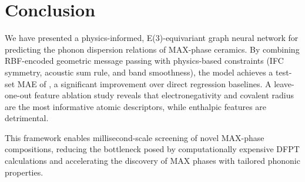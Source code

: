 \section{Conclusion}

We have presented a physics-informed, E(3)-equivariant graph
neural network for predicting the phonon dispersion relations
of MAX-phase ceramics.
By combining RBF-encoded geometric message passing with
physics-based constraints (IFC symmetry, acoustic sum rule,
and band smoothness), the model achieves a test-set MAE of
\THz, a significant improvement over direct
regression baselines.
A leave-one-out feature ablation study reveals that
electronegativity and covalent radius are the most informative
atomic descriptors, while enthalpic features are detrimental.

This framework enables millisecond-scale screening of novel
MAX-phase compositions, reducing the bottleneck posed by
computationally expensive DFPT calculations and accelerating
the discovery of MAX phases with tailored phononic properties.
